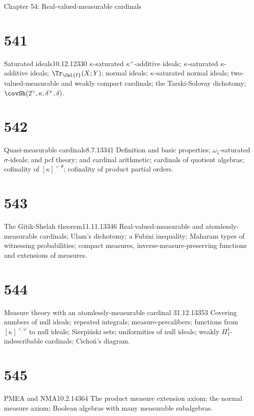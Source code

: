 

Chapter 54:  Real-valued-measurable cardinals


\section{541}{Saturated ideals}{10.12.12}{}{330}
{$\kappa$-saturated $\kappa^+$-additive ideals;  $\kappa$-saturated
$\kappa$-additive ideals;  $\Tr_{\Cal{I}}(X;Y)$;  normal ideals;
$\kappa$-saturated normal ideals;  two-valued-measurable and weakly
compact cardinals;  the Tarski-Solovay dichotomy;
$\covSh(2^{\gamma},\kappa,\delta^+,\delta)$.}

\section{542}{Quasi-measurable cardinals}{8.7.13}{}{341}
{Definition and basic properties;  $\omega_1$-saturated $\sigma$-ideals;
and pcf theory;  and cardinal arithmetic;
cardinals of quotient algebras;  cofinality of $[\kappa]^{<\theta}$;
cofinality of product partial orders.}

\section{543}{The Gitik-Shelah theorem}{11.11.13}{}{346}
{Real-valued-measurable and atomlessly-measurable cardinals;  Ulam's
dichotomy;  a Fubini inequality;  Maharam types of witnessing
probabilities;  compact measures, inverse-measure-preserving functions and
extensions of measures.}

\section{544}{Measure theory with an atomlessly-measurable cardinal}
{31.12.13}{}{353}
{Covering numbers of null ideals;  repeated integrals;
measure-precalibers;  functions
from $[\kappa]^{<\omega}$ to null ideals;  Sierpi\'nski sets;
uniformities of null ideals;  weakly $\Pi^1_1$-indescribable cardinals;
Cicho\'n's diagram.}

\section{545}{PMEA and NMA}{10.2.14}{}{364}
{The product measure extension axiom;  the normal measure axiom;  Boolean
algebras with many measurable subalgebras.}

